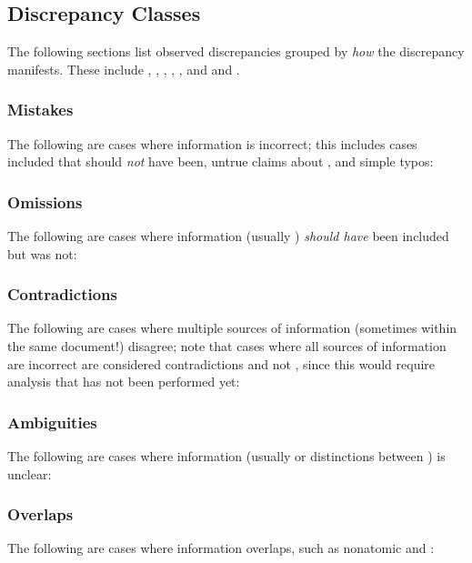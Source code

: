      \fi

\subsection{Discrepancy Classes}
\label{discrepClasses}

The following sections list observed discrepancies grouped by \emph{how} the
discrepancy manifests. These include , ,
, , \ifnotpaper {}, and
    \else and \fi.

\subsubsection{Mistakes}
\label{wrong}
The following are cases where information is incorrect; this includes cases
\terms{} included that should \emph{not} have been, untrue claims about
\srcs{}, and simple typos:



\subsubsection{Omissions}
\label{miss}
The following are cases where information (usually ) \emph{should have}
been included but was not:



\subsubsection{Contradictions}
\label{contra}
The following are cases where multiple sources of information (sometimes within
the same document!) disagree; note that cases where all sources of information
are incorrect are considered contradictions and not , since this
would require analysis that has not been performed yet:



\subsubsection{Ambiguities}
\label{ambi}
The following are cases where information (usually  or distinctions
between \terms{}) is unclear:



\subsubsection{Overlaps}
\label{over}
The following are cases where information overlaps, such as nonatomic 
and \terms{}:

